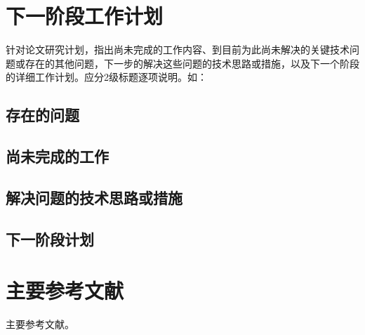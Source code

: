 \documentclass{buaa-midterm}
\begin{document}
\section{下一阶段工作计划}

针对论文研究计划，指出尚未完成的工作内容、到目前为此尚未解决的关键技术问题或存在的其他问题，下一步的解决这些问题的技术思路或措施，以及下一个阶段的详细工作计划。应分2级标题逐项说明。如：

\subsection{存在的问题}

\subsection{尚未完成的工作}

\subsection{解决问题的技术思路或措施}

\subsection{下一阶段计划}

\section{主要参考文献}

主要参考文献。
\end{document}
